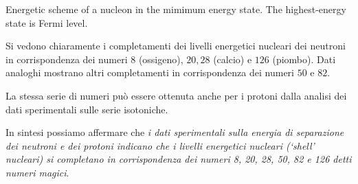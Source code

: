 \begin{marginfigure}
	\caption{Energetic scheme of a nucleon in the mimimum energy state. The highest-energy state is Fermi level.}
	\label{fig:neutron-separation-energy8-20-82}
\end{marginfigure}
Si vedono chiaramente i completamenti dei livelli energetici nucleari dei neutroni in corrispondenza dei numeri $8$
(ossigeno), $20, 28$ (calcio) e $126$ (piombo).
Dati analoghi mostrano altri completamenti in corrispondenza dei numeri $50$ e $82$.

La stessa serie di numeri può essere ottenuta anche per i protoni dalla analisi dei dati sperimentali sulle serie isotoniche.

In sintesi possiamo affermare che
\emph{i dati sperimentali sulla energia di separazione dei neutroni e dei protoni indicano che i  livelli energetici nucleari (‘shell’ nucleari)
	si completano in corrispondenza dei numeri 8, 20, 28, 50, 82 e 126 detti numeri magici}.
\bigskip

